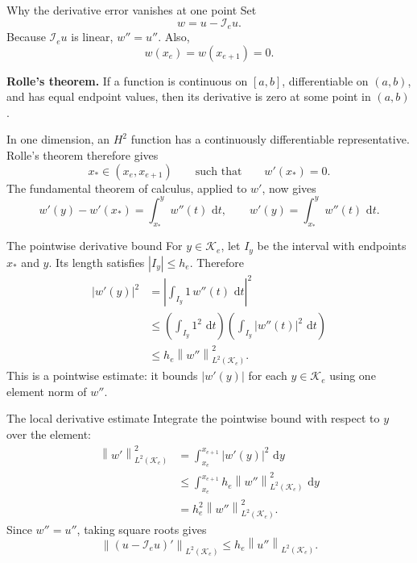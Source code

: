 \documentclass[11pt,aspectratio=169]{beamer}
\newcommand{\dd}{\,\mathrm{d}}
\newcommand{\Ie}{\mathcal I_e}
\newcommand{\norm}[2][]{\left\lVert#2\right\rVert_{#1}}
\begin{document}
\begin{frame}{Why the derivative error vanishes at one point}
Set
\[
  w=u-\Ie u.
\]
Because $\Ie u$ is linear, $w''=u''$. Also,
\[
  w(x_e)=w(x_{e+1})=0.
\]

\textbf{Rolle's theorem.} If a function is continuous on $[a,b]$,
differentiable on $(a,b)$, and has equal endpoint values, then its derivative
is zero at some point in $(a,b)$.

In one dimension, an $H^2$ function has a continuously differentiable
representative. Rolle's theorem therefore gives
\[
  x_*\in(x_e,x_{e+1})
  \qquad\text{such that}\qquad
  w'(x_*)=0.
\]
The fundamental theorem of calculus, applied to $w'$, now gives
\[
  w'(y)-w'(x_*)=\int_{x_*}^{y}w''(t)\,\dd t,
  \qquad
  w'(y)=\int_{x_*}^{y}w''(t)\,\dd t.
\]
\end{frame}

\begin{frame}{The pointwise derivative bound}
For $y\in\mathcal K_e$, let $I_y$ be the interval with endpoints $x_*$ and
$y$. Its length satisfies $|I_y|\leq h_e$. Therefore
\begin{align*}
  |w'(y)|^2
  &=
  \left|\int_{I_y}1\,w''(t)\,\dd t\right|^2\\
  &\leq
  \left(\int_{I_y}1^2\,\dd t\right)
  \left(\int_{I_y}|w''(t)|^2\,\dd t\right)\\
  &\leq
  h_e\norm[L^2(\mathcal K_e)]{w''}^2.
\end{align*}
This is a pointwise estimate: it bounds $|w'(y)|$ for each
$y\in\mathcal K_e$ using one element norm of $w''$.
\end{frame}

\begin{frame}{The local derivative estimate}
Integrate the pointwise bound with respect to $y$ over the element:
\begin{align*}
  \norm[L^2(\mathcal K_e)]{w'}^2
  &=\int_{x_e}^{x_{e+1}}|w'(y)|^2\,\dd y\\
  &\leq
  \int_{x_e}^{x_{e+1}}
  h_e\norm[L^2(\mathcal K_e)]{w''}^2\,\dd y\\
  &=h_e^2\norm[L^2(\mathcal K_e)]{w''}^2.
\end{align*}
Since $w''=u''$, taking square roots gives
\[
  \boxed{\norm[L^2(\mathcal K_e)]{(u-\Ie u)'}
  \leq h_e\norm[L^2(\mathcal K_e)]{u''}.
  }
\]
\end{frame}
\end{document}
